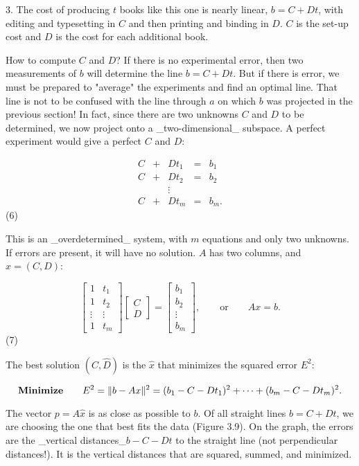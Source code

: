 3. The cost of producing \(t\) books like this one is nearly linear, \(b=C+Dt\), with editing and typesetting in \(C\) and then printing and binding in \(D\). \(C\) is the set-up cost and \(D\) is the cost for each additional book.

How to compute \(C\) and \(D\)? If there is no experimental error, then two measurements of \(b\) will determine the line \(b=C+Dt\). But if there is error, we must be prepared to "average" the experiments and find an optimal line. That line is not to be confused with the line through \(a\) on which \(b\) was projected in the previous section! In fact, since there are two unknowns \(C\) and \(D\) to be determined, we now project onto a _two-dimensional_ subspace. A perfect experiment would give a perfect \(C\) and \(D\):

\[\begin{array}{ccccccc}C&+&Dt_{1}&=&b_{1}\\ C&+&Dt_{2}&=&b_{2}\\ &&\vdots&\\ C&+&Dt_{m}&=&b_{m}.\end{array}\] (6)

This is an _overdetermined_ system, with \(m\) equations and only two unknowns. If errors are present, it will have no solution. \(A\) has two columns, and \(x=(C,D)\):

\[\begin{bmatrix}1&t_{1}\\ 1&t_{2}\\ \vdots&\vdots\\ 1&t_{m}\end{bmatrix}\begin{bmatrix}C\\ D\end{bmatrix}=\begin{bmatrix}b_{1}\\ b_{2}\\ \vdots\\ b_{m}\end{bmatrix},\qquad\text{or}\qquad Ax=b.\] (7)

The best solution \((\widehat{C},\widehat{D})\) is the \(\widehat{x}\) that minimizes the squared error \(E^{2}\):

\[\text{\bf Minimize}\qquad E^{2}=\|b-Ax\|^{2}=(b_{1}-C-Dt_{1})^{2}+\cdots+(b_{ m}-C-Dt_{m})^{2}.\]

The vector \(p=A\widehat{x}\) is as close as possible to \(b\). Of all straight lines \(b=C+Dt\), we are choosing the one that best fits the data (Figure 3.9). On the graph, the errors are the _vertical distances_\(b-C-Dt\) to the straight line (not perpendicular distances!). It is the vertical distances that are squared, summed, and minimized.

